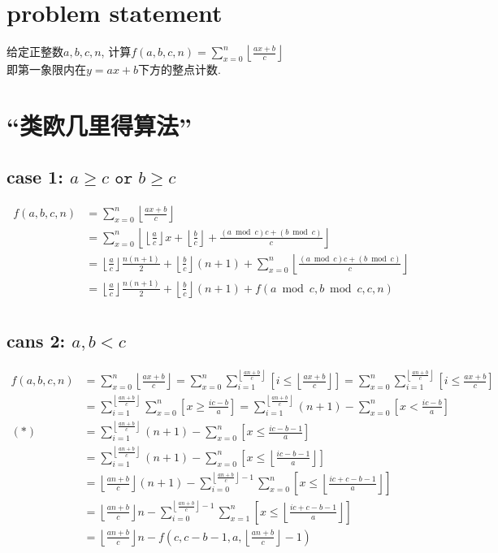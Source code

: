 \documentclass{article}
\begin{document}
\newcommand{\FLR}[1]{{ \left\lfloor #1 \right\rfloor }}

\section{problem statement}

\noindent 给定正整数$a,b,c,n$,
计算$\displaystyle f(a,b,c,n)=\sum_{x=0}^n \FLR{\frac{ax+b}{c}}$\\
即第一象限内在$y=ax+b$下方的整点计数.

\section{``类欧几里得算法''}

\subsection*{case 1: $a\geq c \texttt{ or } b\geq c$}

\[
	\begin{aligned}
		f(a,b,c,n)
			&=\sum_{x=0}^n \FLR{\frac{ax+b}{c}}\\
			&=\sum_{x=0}^n
				\FLR{
					\FLR{\frac{a}{c}} x + \FLR{\frac{b}{c}}+
					\frac{(a\bmod c)c+(b\bmod c)}{c}
				}\\
			&=\FLR{\frac{a}{c}}\frac{n(n+1)}{2} + \FLR{\frac{b}{c}}(n+1) +
				\sum_{x=0}^n \FLR{\frac{(a\bmod c)c+(b\bmod c)}{c}}\\
			&=\FLR{\frac{a}{c}}\frac{n(n+1)}{2} + \FLR{\frac{b}{c}}(n+1)
				+ f(a\bmod c,b\bmod c,c,n)\\
	\end{aligned}
\]


\subsection*{cans 2: $a,b < c$}

\[
	\begin{aligned}
		f(a,b,c,n)
			&=\sum_{x=0}^n \FLR{\frac{ax+b}{c}}
			 =\sum_{x=0}^n \sum_{i=1}^\FLR{\frac{an+b}{c}}
				\left[ i \leq \FLR{\frac{ax+b}{c}} \right]
			 =\sum_{x=0}^n \sum_{i=1}^{\left\lfloor\frac{an+b}{c}\right\rfloor}
			 	\left[ i \leq \frac{ax+b}{c} \right]\\
			&=\sum_{i=1}^\FLR{\frac{an+b}{c}}
					\sum_{x=0}^n \left[ x\geq \frac{ic-b}{a} \right]
			=\sum_{i=1}^\FLR{\frac{an+b}{c}}
					(n+1)-\sum_{x=0}^n \left[ x < \frac{ic-b}{a}\right]\\
	(*) &=\sum_{i=1}^\FLR{\frac{an+b}{c}}
					(n+1)-\sum_{x=0}^n \left[ x \leq \frac{ic-b-1}{a}\right]\\
			&=\sum_{i=1}^\FLR{\frac{an+b}{c}}
					(n+1)-\sum_{x=0}^n \left[ x \leq \FLR{\frac{ic-b-1}{a}}\right]\\
			&=\FLR{\frac{an+b}{c}}(n+1)
				-\sum_{i=0}^{\FLR{\frac{an+b}{c}} -1}
				\sum_{x=0}^n \left[ x \leq \FLR{\frac{ic+c-b-1}{a}}\right]\\
			&=\FLR{\frac{an+b}{c}} n
				-\sum_{i=0}^{\FLR{\frac{an+b}{c}}- 1}
				\sum_{x=1}^n \left[ x \leq \FLR{\frac{ic+c-b-1}{a}}\right]\\
			&=\FLR{\frac{an+b}{c}}n-f\left(c,c-b-1,a,\FLR{\frac{an+b}{c}} -1\right)
	\end{aligned}
\]
\end{document}
